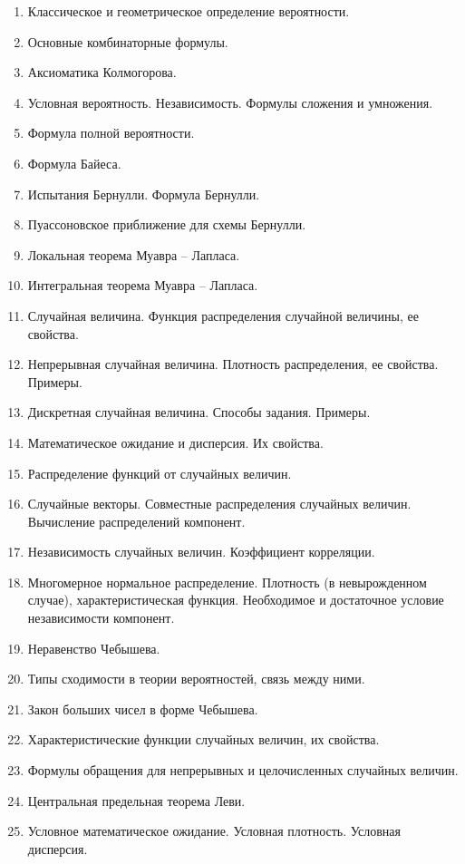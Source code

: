 \documentclass[14pt]{extarticle}
\theoremstyle{breakstyle}
\begin{document}
\begin{enumerate}
    \item Классическое и геометрическое определение вероятности.
    \item Основные комбинаторные формулы.
    \item Аксиоматика Колмогорова.
    \item Условная вероятность. Независимость. Формулы сложения и умножения.
    \item Формула полной вероятности.
    \item Формула Байеса.
    \item Испытания Бернулли. Формула Бернулли.
    \item Пуассоновское приближение для схемы Бернулли.
    \item Локальная теорема Муавра – Лапласа.
    \item Интегральная теорема Муавра – Лапласа.
    \item Случайная величина. Функция распределения случайной величины, ее свойства.
    \item Непрерывная случайная величина. Плотность распределения, ее свойства. Примеры.
    \item Дискретная случайная величина. Способы задания. Примеры.
    \item Математическое ожидание и дисперсия. Их свойства.
    \item Распределение функций от случайных величин.
    \item Случайные векторы. Совместные распределения случайных величин. Вычисление распределений компонент.
    \item Независимость случайных величин. Коэффициент корреляции.
    \item Многомерное нормальное распределение. Плотность (в невырожденном случае), характеристическая функция. Необходимое и достаточное условие независимости компонент.
    \item Неравенство Чебышева.
    \item Типы сходимости в теории вероятностей, связь между ними.
    \item Закон больших чисел в форме Чебышева.
    \item Характеристические функции случайных величин, их свойства.
    \item Формулы обращения для непрерывных и целочисленных случайных величин.
    \item Центральная предельная теорема Леви.
    \item Условное математическое ожидание. Условная плотность. Условная дисперсия.

\end{enumerate}
\end{document}
